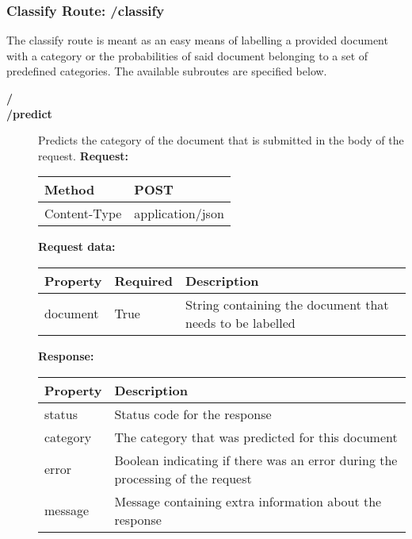 \subsubsection{Classify Route: /classify}
The classify route is meant as an easy means of labelling a provided document with a category or the probabilities of said document belonging to a set of predefined categories.
The available subroutes are specified below.
\begin{description}
\item[\textbf{/}]
\item[\textbf{/predict}]
Predicts the category of the document that is submitted in the body of the request.
\newline
\newline
\textbf{Request:}
\newline
\newline
\begin{tabular}{ | l | l |}
\hline
Method & POST\\ \hline
Content-Type & application/json\\ \hline
\end{tabular}
\newline
\newline
\textbf{Request data:}
\newline
\newline
\begin{tabular}{ | l | l | l |}
\hline
\textbf{Property} & \textbf{Required} & \textbf{Description}\\ \hline
document & True & String containing the document that needs to be labelled\\ \hline
\end{tabular}
\newline
\newline
\textbf{Response:}
\newline
\newline
\begin{tabular}{ | l | l |}
\hline
\textbf{Property} & \textbf{Description}\\ \hline
status & Status code for the response\\ \hline
category & The category that was predicted for this document\\ \hline
error & Boolean indicating if there was an error during the processing of the request\\ \hline
message & Message containing extra information about the response\\ \hline
\end{tabular}\\

\end{description}
